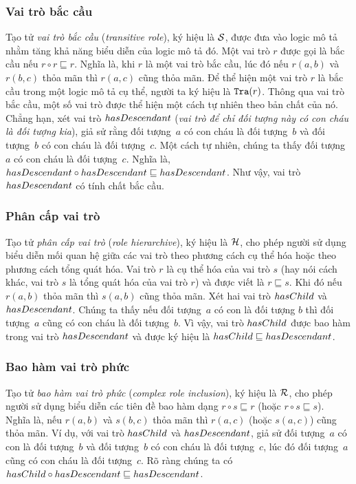 \subsubsection{Vai trò bắc cầu}
\label{sec:Chap1.Transitive}
Tạo tử {\em vai trò bắc cầu} ({\em transitive role}), ký hiệu là $\mathcal{S}$, được đưa vào logic mô tả nhằm tăng khả năng biểu diễn của logic mô tả đó. Một vai trò $r$ được gọi là bắc cầu nếu $r \circ r \sqsubseteq r$. Nghĩa là, khi $r$ là một vai trò bắc cầu, lúc đó nếu $r(a,b)$ và $r(b,c)$ thỏa mãn thì $r(a,c)$ cũng thỏa mãn. Để thể hiện một vai trò $r$ là bắc cầu trong một logic mô tả cụ thể, người ta ký hiệu là $\mathtt{Tra}(r)$.
%
Thông qua vai trò bắc cầu, một số vai trò được thể hiện một cách tự nhiên theo bản chất của nó. Chẳng hạn, xét vai trò $hasDescendant$ ({\em vai trò để chỉ đối tượng này có con cháu là đối tượng kia}), giả sử rằng đối tượng~$a$ có con cháu là đối tượng~$b$ và đối tượng~$b$ có con cháu là đối tượng~$c$. Một cách tự nhiên, chúng ta thấy đối tượng~$a$ có con cháu là đối tượng~$c$. Nghĩa là, $hasDescendant \circ hasDescendant \sqsubseteq hasDescendant$. Như vậy, vai trò $hasDescendant$ có tính chất bắc cầu.

\subsubsection{Phân cấp vai trò}
\label{sec:Chap1.Hierarchive}
Tạo tử {\em phân cấp vai trò} ({\em role hierarchive}), ký hiệu là $\mathcal{H}$, cho phép người sử dụng biểu diễn mối quan hệ giữa các vai trò theo phương cách cụ thể hóa hoặc theo phương cách tổng quát hóa. Vai trò $r$ là cụ thể hóa của vai trò $s$ (hay nói cách khác, vai trò $s$ là tổng quát hóa của vai trò $r$) và được viết là $r \sqsubseteq s$. Khi đó nếu $r(a,b)$ thỏa mãn thì $s(a,b)$ cũng thỏa mãn.
Xét hai vai trò $hasChild$ và $hasDescendant$. Chúng ta thấy nếu đối tượng~$a$ có con là đối tượng $b$ thì đối tượng~$a$ cũng có con cháu là đối tượng~$b$. Vì vậy, vai trò $hasChild$ được bao hàm trong vai trò $hasDescendant$ và được ký hiệu là $hasChild \sqsubseteq hasDescendant$.

\subsubsection{Bao hàm vai trò phức}
\label{sec:Chap1.RoleInclusion}
Tạo tử {\em bao hàm vai trò phức} ({\em complex role inclusion}), ký hiệu là $\mathcal{R}$, cho phép người sử dụng biểu diễn các tiên đề bao hàm dạng $r \circ s \sqsubseteq r$ (hoặc $r \circ s \sqsubseteq s$). Nghĩa là, nếu $r(a,b)$ và $s(b,c)$ thỏa mãn thì $r(a,c)$ (hoặc $s(a,c)$) cũng thỏa mãn. Ví dụ, với vai trò $hasChild$ và $hasDescendant$, giả sử đối tượng~$a$ có con là đối tượng~$b$ và đối tượng~$b$ có con cháu là đối tượng~$c$, lúc đó đối tượng~$a$ cũng có con cháu là đối tượng~$c$. Rõ ràng chúng ta có $hasChild \circ hasDescendant \sqsubseteq hasDescendant$.

